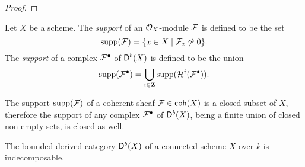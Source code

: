 \begin{proof}
    
\end{proof}

\begin{definition}
    \label{Definition of support}
    Let $X$ be a scheme. The \emph{support} of an ${\mathcal{O}_{X}}$-module $\mathcal F$ is defined to be the set
    \[
        \operatorname{supp}(\mathcal F) = \{x \in X \mid \mathcal F_x \not\simeq 0 \}.
    \] 
    The \emph{support} of a complex $\mathcal F^\bullet$ of $\mathsf{D}^b(X)$ is defined to be the union
    \[
        \operatorname{supp}(\mathcal F^\bullet) = \bigcup_{i \in \mathbf Z} \operatorname{supp}(\mathcal H^i(\mathcal F^\bullet)).
    \]
\end{definition}

\begin{remark}
    \label{supports closed}
    The support $\operatorname{supp}(\mathcal F)$ of a coherent sheaf $\mathcal F \in \mathsf{coh}(X)$ is a closed subset of $X$, therefore the support of any complex $\mathcal F^\bullet$ of $\mathsf{D}^b(X)$, being a finite union of closed non-empty sets, is closed as well.
\end{remark}

\begin{theorem}
    \label{Db(X) indecomposable for X connected}
    The bounded derived category $\mathsf{D}^b(X)$ of a connected scheme $X$ over $k$ is indecomposable.
\end{theorem}

